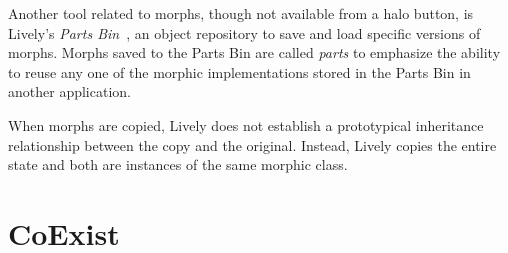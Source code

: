 Another tool related to morphs, though not available from a halo button, is Lively's \emph{Parts Bin}~\cite{Lincke2012LPC}, an object repository to save and load specific versions of morphs.
Morphs saved to the Parts Bin are called \emph{parts} to emphasize the ability to reuse any one of the morphic implementations stored in the Parts Bin in another application.

When morphs are copied, Lively does not establish a prototypical inheritance relationship between the copy and the original.
Instead, Lively copies the entire state and both are instances of the same morphic class.






\section{CoExist}


